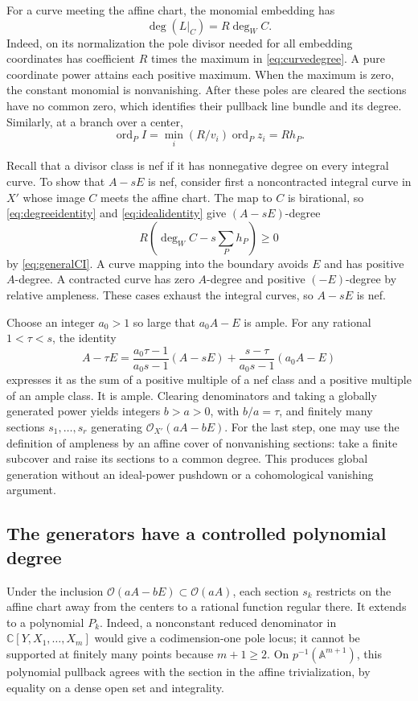 \documentclass[11pt]{article}
\theoremstyle{definition}
\theoremstyle{remark}
\newcommand{\C}{\mathbb C}
\newcommand{\ord}{\operatorname{ord}}
\newcommand{\OO}{\mathcal O}
\numberwithin{equation}{section}
\begin{document}
For a curve meeting the affine chart, the monomial embedding has
\begin{equation}\label{eq:degreeidentity}
 \deg(L|_C)=R\deg_W C.
\end{equation}
Indeed, on its normalization the pole divisor needed for all embedding
coordinates has coefficient \(R\) times the maximum in
\eqref{eq:curvedegree}. A pure coordinate power attains each positive
maximum. When the maximum is zero, the constant monomial is nonvanishing.
After these poles are cleared the sections
have no common zero, which identifies their pullback line bundle and
its degree. Similarly, at a branch over a center,
\begin{equation}\label{eq:idealidentity}
 \ord_P I=\min_i(R/v_i)\ord_Pz_i=Rh_P.
\end{equation}

Recall that a divisor class is nef if it has nonnegative degree on every
integral curve. To show that \(A-sE\) is nef, consider first a
noncontracted integral curve in \(X'\) whose image \(C\) meets the
affine chart. The map to \(C\) is birational, so
\eqref{eq:degreeidentity} and \eqref{eq:idealidentity} give
\((A-sE)\)-degree
\[
 R\left(\deg_W C-s\sum_P h_P\right)\ge0
\]
by \eqref{eq:generalCI}. A curve mapping into
the boundary avoids \(E\) and has positive \(A\)-degree. A
contracted curve has zero \(A\)-degree and positive \((-E)\)-degree
by relative ampleness. These cases exhaust the integral curves,
so \(A-sE\) is nef.

Choose an integer \(a_0>1\) so large that \(a_0A-E\) is ample.
For any rational \(1<\tau<s\), the identity
\begin{equation}\label{eq:amplecombination}
 A-\tau E=
 \frac{a_0\tau-1}{a_0s-1}(A-sE)
 +\frac{s-\tau}{a_0s-1}(a_0A-E)
\end{equation}
expresses it as the sum of a positive multiple of a nef class and
a positive multiple of an ample class. It is ample. Clearing
denominators and taking a globally generated power yields integers
\(b>a>0\), with \(b/a=\tau\), and finitely many sections
\(s_1,\ldots,s_r\) generating \(\OO_{X'}(aA-bE)\).
For the last step, one may use the definition of ampleness by an
affine cover of nonvanishing sections: take a finite subcover and
raise its sections to a common degree. This produces global generation
without an ideal-power pushdown or a cohomological vanishing argument.

\subsection{The generators have a controlled polynomial degree}
Under the inclusion \(\OO(aA-bE)\subset\OO(aA)\), each section \(s_k\)
restricts on the affine chart away from the centers to a rational
function regular there. It extends to a polynomial \(P_k\).
Indeed, a nonconstant reduced denominator in
\(\C[Y,X_1,\ldots,X_m]\) would give a codimension-one pole locus;
it cannot be supported at finitely many points because \(m+1\ge2\).
On \(p^{-1}(\mathbb A^{m+1})\), this polynomial pullback agrees
with the section in the affine trivialization, by equality on a
dense open set and integrality.
\end{document}
